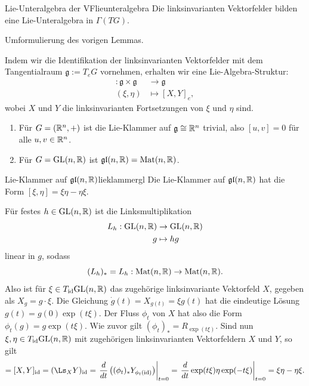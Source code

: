 \begin{korollar}{Lie-Unteralgebra der VF}{lieunteralgebra}
Die linksinvarianten Vektorfelder bilden eine Lie-Unteralgebra in $\Gamma (TG)$.
\end{korollar}
\begin{beweis}
Umformulierung des vorigen Lemmas.
\end{beweis}
\begin{bemerkung}
Indem wir die Identifikation der linksinvarianten Vektorfelder mit dem Tangentialraum $\mathfrak{g}:= T_eG$ vornehmen, erhalten wir eine Lie-Algebra-Struktur:
\begin{align}
[.,.]: \mathfrak{g} \times \mathfrak{g} &\to \mathfrak{g}\\
(\xi, \eta) &\mapsto [X, Y]_e,
\end{align}
wobei $X$ und $Y$ die linksinvarianten Fortsetzungen von $\xi$ und $\eta$ sind.
\end{bemerkung}
\begin{beispiele}
\begin{enumerate}
\item Für $G=(\mathbb{R}^n,+)$ ist die Lie-Klammer auf $\mathfrak{g} \cong \mathbb{R}^n$ trivial, also $[u,v]=0$ für alle $u, v \in \mathbb{R}^n$.
\item Für $G = \text{GL}(n, \mathbb{R})$ ist $\mathfrak{gl}(n, \mathbb{R}) = \text{Mat}(n, \mathbb{R})$.
\end{enumerate}
\end{beispiele}
\begin{satz}{Lie-Klammer auf $\mathfrak{gl}(n,\mathbb{R})$}{lieklammergl}
Die Lie-Klammer auf $\mathfrak{gl}(n, \mathbb{R})$ hat die Form $[\xi, \eta] = \xi \eta - \eta \xi$.
\end{satz}
\begin{beweis}
Für festes $h \in \text{GL}(n, \mathbb{R})$ ist die Linksmultiplikation 
\begin{align}
L_h: \text{GL}(n, \mathbb{R}) &\to \text{GL}(n, \mathbb{R})\\
g &\mapsto hg
\end{align}
linear in $g$, sodass
\begin{equation}
(L_h)_\ast = L_h: \text{Mat}(n,\mathbb{R}) \to \text{Mat}(n, \mathbb{R}).
\end{equation}
Also ist für $\xi \in T_{\text{id}} \text{GL}(n, \mathbb{R})$ das zugehörige linksinvariante Vektorfeld $X$, gegeben als $X_g = g \cdot \xi$. Die Gleichung $\dot{g}(t) = X_{g(t)} = \xi g(t)$ hat die eindeutige Lösung $g(t) = g(0) \exp (t \xi)$. Der Fluss $\phi_t$ von $X$ hat also die Form $\phi_t (g) = g \exp (t \xi)$. Wie zuvor gilt $(\phi_t)_\ast = R_{\exp (t \xi)}$. Sind nun $\xi, \eta \in T_{\text{id}} \text{GL}(n, \mathbb{R})$ mit zugehörigen linksinvarianten Vektorfeldern $X$ und $Y$, so gilt
\begin{equation}
[\xi, \eta] = [X,Y]_\id = (\Ls_XY)_\id = \left.\frac{d}{dt} \left( (\phi_t)_\ast Y_{\phi_t(\id)} \right)\right|_{t=0}=\left. \frac{d}{dt} \exp(t \xi) \eta \exp(-t \xi) \right|_{t=0} = \xi \eta- \eta \xi.
\end{equation}
\end{beweis}
